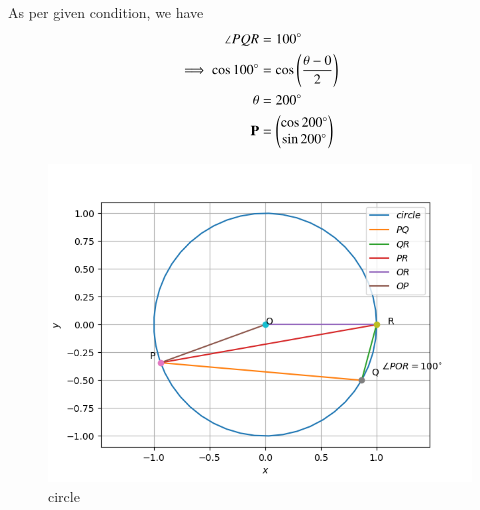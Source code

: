 \documentclass[journal,12pt,twocolumn]{IEEEtran}
\let\vec\mathbf
\begin{document}
As per given condition, we have
\begin{align}
    \angle{PQR}                          & = 100\degree                                                                                                      \\
    \implies \cos100\degree & =  \cos \brak{\frac{\theta - 0}{2}}\\
    \theta  & =   200\degree                \\
    \vec{P} & = \myvec{\cos200\degree \\ \sin200\degree}
\end{align}

\begin{figure}[!htb]
    \centering
    \includegraphics[width=\columnwidth]{figs/circle.png}
    \caption{circle}
    \label{fig:circle}
\end{figure}
\end{document}
